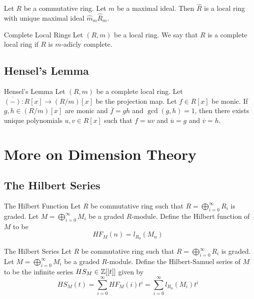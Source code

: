\documentclass[a4paper]{article}
\begin{document}
\begin{prp}{}{} Let $R$ be a commutative ring. Let $m$ be a maximal ideal. Then $\widehat{R}$ is a local ring with unique maximal ideal $\widehat{m}_m\widehat{R}_m$. 
\end{prp}

\begin{defn}{Complete Local Rings}{} Let $(R,m)$ be a local ring. We say that $R$ is a complete local ring if $R$ is $m$-adicly complete. 
\end{defn}

\subsection{Hensel's Lemma}
\begin{thm}{Hensel's Lemma}{} Let $(R,m)$ be a complete local ring. Let $\overline{(-)}:R[x]\to(R/m)[x]$ be the projection map. Let $f\in R[x]$ be monic. If $g,h\in(R/m)[x]$ are monic and $\overline{f}=gh$ and $\gcd(g,h)=1$, then there exists unique polynomials $u,v\in R[x]$ such that $f=uv$ and $\overline{u}=g$ and $\overline{v}=h$. 
\end{thm}

\pagebreak
\section{More on Dimension Theory}
\subsection{The Hilbert Series}
\begin{defn}{The Hilbert Function}{} Let $R$ be commutative ring such that $R=\bigoplus_{i=0}^\infty R_i$ is graded. Let $M=\bigoplus_{i=0}^\infty M_i$ be a graded $R$-module. Define the Hilbert function of $M$ to be $$HF_M(n)=l_{R_0}(M_n)$$
\end{defn}

\begin{defn}{The Hilbert Series}{} Let $R$ be commutative ring such that $R=\bigoplus_{i=0}^\infty R_i$ is graded. Let $M=\bigoplus_{i=0}^\infty M_i$ be a graded $R$-module. Define the Hilbert-Samuel series of $M$ to be the infinite series $HS_M\in\mathbb{Z}[[t]]$ given by $$HS_M(t)=\sum_{i=0}^\infty HF_M(i)t^i=\sum_{i=0}^\infty l_{R_0}(M_i)t^i$$
\end{defn}
\end{document}
